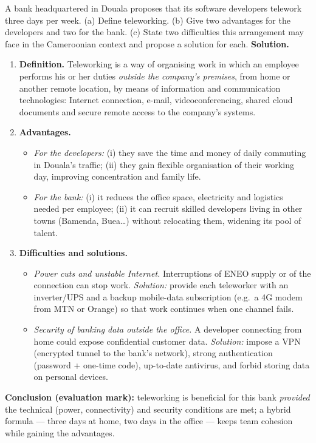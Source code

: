 \documentclass[11pt]{article}
\newcommand{\cle}[1]{{\popxbold\color{popdark}#1}}
\begin{document}
\begin{exoresolu}
A bank headquartered in Douala proposes that its software developers telework three days per week. (a) Define teleworking. (b) Give two advantages for the developers and two for the bank. (c) State two difficulties this arrangement may face in the Cameroonian context and propose a solution for each.
\tcblower
\textbf{Solution.}
\begin{enumerate}
\item[(a)] \textbf{Definition.} Teleworking is a way of organising work in which an employee performs his or her duties \emph{outside the company's premises}, from home or another remote location, by means of information and communication technologies: Internet connection, e-mail, videoconferencing, shared cloud documents and secure remote access to the company's systems.
\item[(b)] \textbf{Advantages.}
\begin{itemize}
\item \emph{For the developers:} (i) they save the time and money of daily commuting in Douala's traffic; (ii) they gain flexible organisation of their working day, improving concentration and family life.
\item \emph{For the bank:} (i) it reduces the office space, electricity and logistics needed per employee; (ii) it can recruit skilled developers living in other towns (Bamenda, Buea\ldots) without relocating them, widening its pool of talent.
\end{itemize}
\item[(c)] \textbf{Difficulties and solutions.}
\begin{itemize}
\item \emph{Power cuts and unstable Internet.} Interruptions of ENEO supply or of the connection can stop work. \emph{Solution:} provide each teleworker with an inverter/UPS and a backup mobile-data subscription (e.g.\ a 4G modem from MTN or Orange) so that work continues when one channel fails.
\item \emph{Security of banking data outside the office.} A developer connecting from home could expose confidential customer data. \emph{Solution:} impose a \cle{VPN} (encrypted tunnel to the bank's network), strong authentication (password + one-time code), up-to-date antivirus, and forbid storing data on personal devices.
\end{itemize}
\end{enumerate}
\textbf{Conclusion (evaluation mark):} teleworking is beneficial for this bank \emph{provided} the technical (power, connectivity) and security conditions are met; a hybrid formula --- three days at home, two days in the office --- keeps team cohesion while gaining the advantages.
\end{exoresolu}
\end{document}
